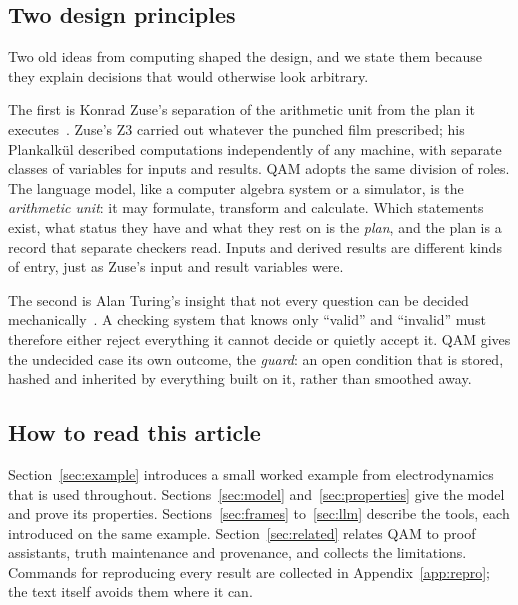 \subsection{Two design principles}

Two old ideas from computing shaped the design, and we state them because they explain decisions that would otherwise look
arbitrary.

The first is Konrad Zuse's separation of the arithmetic unit from the plan it executes~\cite{rojas97,bauer72}. Zuse's Z3 carried out
whatever the punched film prescribed; his Plankalk\"ul described computations independently of any machine, with separate classes of
variables for inputs and results. QAM adopts the same division of roles. The language model, like a computer algebra system or a
simulator, is the \emph{arithmetic unit}: it may formulate, transform and calculate. Which statements exist, what status they have and
what they rest on is the \emph{plan}, and the plan is a record that separate checkers read. Inputs and derived results are different
kinds of entry, just as Zuse's input and result variables were.

The second is Alan Turing's insight that not every question can be decided mechanically~\cite{turing36}. A checking system that knows
only ``valid'' and ``invalid'' must therefore either reject everything it cannot decide or quietly accept it. QAM gives the undecided
case its own outcome, the \emph{guard}: an open condition that is stored, hashed and inherited by everything built on it, rather than
smoothed away.

\subsection{How to read this article}

Section~\ref{sec:example} introduces a small worked example from electrodynamics that is used throughout. Sections~\ref{sec:model}
and~\ref{sec:properties} give the model and prove its properties. Sections~\ref{sec:frames} to~\ref{sec:llm} describe the tools, each
introduced on the same example. Section~\ref{sec:related} relates QAM to proof assistants, truth maintenance and provenance, and
collects the limitations. Commands for reproducing every result are collected in Appendix~\ref{app:repro}; the text itself avoids them
where it can.
